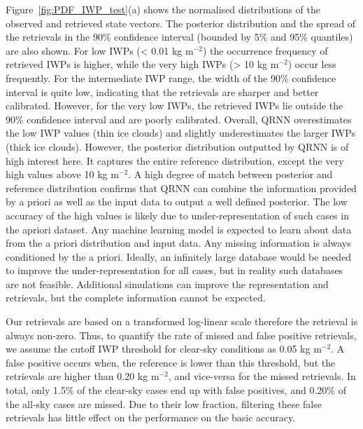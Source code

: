 \documentclass[amt, manuscript]{copernicus}
\begin{document}
Figure~\ref{fig:PDF_IWP_test}(a) shows the normalised distributions of the observed and retrieved state vectors. The posterior distribution and the spread of the retrievals in the 90\% confidence interval (bounded by 5\% and 95\% quantiles) are also shown. For low IWPs (< 0.01\,\,kg m$^{-2}$) the occurrence frequency of retrieved IWPs is higher, while the very high IWPs (> 10\,\,kg m$^{-2}$) occur less frequently. For the intermediate IWP range, the width of the 90\% confidence interval is quite low, indicating that the retrievals are  sharper and better calibrated. However, for the very low IWPs, the retrieved IWPs lie outside the 90\% confidence interval and are poorly calibrated. Overall, QRNN overestimates the low IWP values (thin ice clouds) and  slightly underestimates the larger IWPs (thick ice clouds).
However, the posterior distribution outputted by QRNN is of high interest here. It captures the entire reference distribution, except the very high values above 10\,\,kg m$^{-2}$. A high degree of match between posterior and reference distribution confirms that QRNN can combine the information provided by a priori as well as the input data to output a well defined posterior. The low accuracy of the high values is likely due to under-representation of such cases in the apriori dataset. Any machine learning model is expected to learn about data from the a priori distribution and input data. Any missing information is always conditioned by the a priori. Ideally, an infinitely large database would be needed to improve the under-representation for all cases, but in reality such databases are not feasible. Additional simulations can improve the representation and retrievals, but the complete information cannot be expected. 


Our retrievals are based on a transformed log-linear scale therefore the retrieval is always non-zero. Thus, to quantify the rate of missed  and false positive retrievals, we assume the cutoff IWP threshold for clear-sky conditions as 0.05\,\,kg m$^{-2}$. A false positive occurs when, the reference is lower than this threshold, but the retrievals are higher than 0.20\,\,kg m$^{-2}$, and vice-versa for the missed retrievals. In total, only 1.5\% of the clear-sky cases end up with false positives, and 0.20\% of the all-sky cases are missed. Due to their low fraction, filtering these false retrievals has little effect on the performance on the basic accuracy. 

\end{document}
